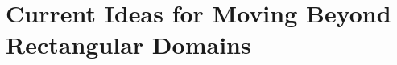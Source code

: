 \documentclass[xcolor={rgb,dvipsnames}]{beamer}		%
\begin{document}
\section{Current Ideas for Moving Beyond Rectangular Domains}
\frame{
\tableofcontents[currentsection]
}

%

%
%
% 
% 
% 
\end{document}
